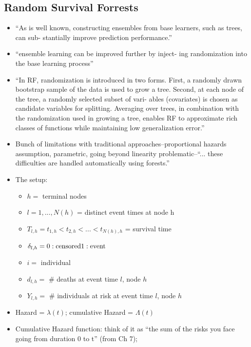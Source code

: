 \documentclass{article}
\begin{document}
\subsection{Random Survival Forrests}
\begin{itemize}
\item ``As is well known, constructing ensembles from base learners, such as trees, can sub- stantially improve prediction performance.''
\item ``ensemble learning can be improved further by inject- ing randomization into the base learning process''
\item ``In RF, randomization is introduced in two forms. First, a randomly drawn bootstrap sample of the data is used to grow a tree. Second, at each node of the tree, a randomly selected subset of vari- ables (covariates) is chosen as candidate variables for splitting. Averaging over trees, in combination with the randomization used in growing a tree, enables RF to approximate rich classes of functions while maintaining low generalization error.''
\item Bunch of limitations with traditional approaches--proportional hazards assumption, parametric, going beyond linearity problematic--``... these difficulties are handled automatically using forests.'' 
\item The setup:
  \begin{itemize}
  \item $h =$ terminal nodes
  \item $l = 1, ..., N(h)$ = distinct event times at node h
  \item $T_{l,h} = t_{1,h} < t_{2,h} < ... < t_{N(h),h}$ = survival time
  \item $\delta_{l,h} = \\ 0: \text{censored} \\ 1: \text{event}$
  \item $i =$ individual
  \item $d_{l,h} =$ \# deaths at event time $l$, node $h$
  \item $Y_{l,h} =$ \# individuals at risk at event time $l$, node $h$
  \end{itemize}
\item Hazard = $\lambda(t)$; cumulative Hazard = $\Lambda(t)$
\item Cumulative Hazard function: think of it as ``the sum of the risks you face going from duration 0 to t'' (from Ch 7); 
\end{itemize}


    


%
\end{document}
